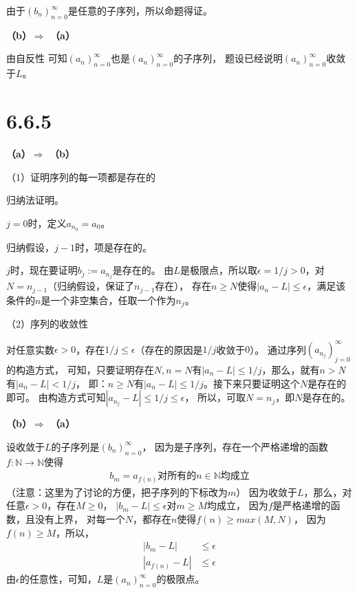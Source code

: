 \documentclass{article}
\theoremstyle{mystyle}
\begin{document}
由于$(b_n)_{n=0}^\infty$是任意的子序列，所以命题得证。

\textbf{（b）$\Rightarrow$ （a）}

由自反性 可知$(a_n)_{n=0}^\infty$也是$(a_n)_{n=0}^\infty$的子序列，
题设已经说明$(a_n)_{n=0}^\infty$收敛于$L$。

\section*{6.6.5}

\textbf{（a）$\Rightarrow$ （b）}

（1）证明序列的每一项都是存在的

归纳法证明。

$j=0$时，定义$a_{n_0}=a_0$。

归纳假设，$j-1$时，项是存在的。

$j$时，现在要证明$b_j:=a_{n_j}$是存在的。
由$L$是极限点，所以取$\epsilon = 1/j > 0$，对$N=n_{j-1}$（归纳假设，保证了$n_{j-1}$存在），
存在$n \geq N$使得$|a_n - L| \leq \epsilon$，满足该条件的$n$是一个非空集合，任取一个作为$n_j$。

（2）序列的收敛性

对任意实数$\epsilon > 0$，存在$1/j \leq \epsilon$（存在的原因是$1/j$收敛于$0$）。
通过序列$(a_{n_j})_{j=0}^\infty$的构造方式，
可知，只要证明存在$N, n = N$有$|a_n - L| \leq 1/j$，那么，就有$n > N$有$|a_n - L| < 1/j$，
即：$n \geq N$有$|a_n - L| \leq 1/j$。接下来只要证明这个$N$是存在的即可。
由构造方式可知$|a_{n_j} - L | \leq 1/j \leq \epsilon$，
所以，可取$N = n_j$，即$N$是存在的。


\textbf{（b）$\Rightarrow$ （a）}

设收敛于$L$的子序列是$(b_n)_{n=0}^\infty$，
因为是子序列，存在一个严格递增的函数$f : \mathbb{N} \rightarrow \mathbb{N}$使得
\begin{align*}
  b_m = a_{f(n)} \text{对所有的$n \in \mathbb{N}$均成立}
\end{align*}
（注意：这里为了讨论的方便，把子序列的下标改为$m$）
因为收敛于$L$，那么，对任意$\epsilon > 0$，存在$M \geq 0$，
$|b_m - L| \leq \epsilon$对$m \geq M$均成立，
因为$f$是严格递增的函数，且没有上界，
对每一个$N$，都存在$n$使得$f(n) \geq max(M, N)$，
因为$f(n) \geq M$，所以，
\begin{align*}
  |b_m - L|      & \leq \epsilon \\
  |a_{f(n)} - L| & \leq \epsilon
\end{align*}
由$\epsilon$的任意性，可知，$L$是$(a_n)_{n=0}^\infty$的极限点。
\end{document}
